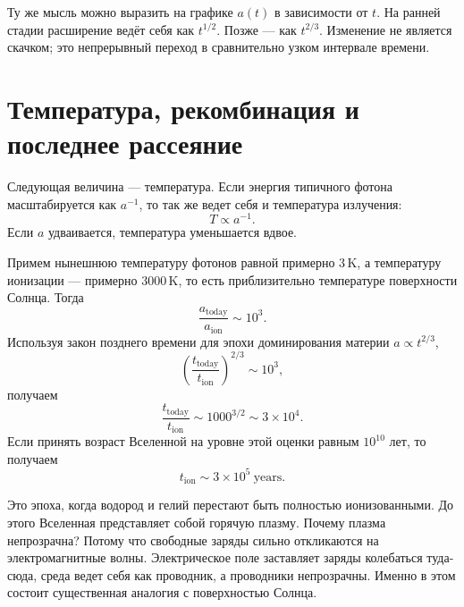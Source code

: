 Ту же мысль можно выразить на графике \(a(t)\) в зависимости от \(t\). На ранней стадии расширение ведёт себя как \(t^{1/2}\). Позже — как \(t^{2/3}\). Изменение не является скачком; это непрерывный переход в сравнительно узком интервале времени.

\begin{classroomqa}
\end{classroomqa}

\section{Температура, рекомбинация и последнее рассеяние}

Следующая величина — температура. Если энергия типичного фотона масштабируется как \(a^{-1}\), то так же ведет себя и температура излучения:
\begin{equation}
T\propto a^{-1}.
\end{equation}
Если \(a\) удваивается, температура уменьшается вдвое.

Примем нынешнюю температуру фотонов равной примерно \(3\,\mathrm K\), а температуру ионизации — примерно \(3000\,\mathrm K\), то есть приблизительно температуре поверхности Солнца. Тогда
\begin{equation}
\frac{a_{\mathrm{today}}}{a_{\mathrm{ion}}}\sim 10^3.
\end{equation}
Используя закон позднего времени для эпохи доминирования материи \(a\propto t^{2/3}\),
\begin{equation}
\left(\frac{t_{\mathrm{today}}}{t_{\mathrm{ion}}}\right)^{2/3}\sim 10^3,
\end{equation}
получаем
\begin{equation}
\frac{t_{\mathrm{today}}}{t_{\mathrm{ion}}}\sim 1000^{3/2}\sim 3\times 10^4.
\end{equation}
Если принять возраст Вселенной на уровне этой оценки равным \(10^{10}\) лет, то получаем
\begin{equation}
t_{\mathrm{ion}}\sim 3\times 10^5\ \mathrm{years}.
\end{equation}

Это эпоха, когда водород и гелий перестают быть полностью ионизованными. До этого Вселенная представляет собой горячую плазму. Почему плазма непрозрачна? Потому что свободные заряды сильно откликаются на электромагнитные волны. Электрическое поле заставляет заряды колебаться туда-сюда, среда ведет себя как проводник, а проводники непрозрачны. Именно в этом состоит существенная аналогия с поверхностью Солнца.

